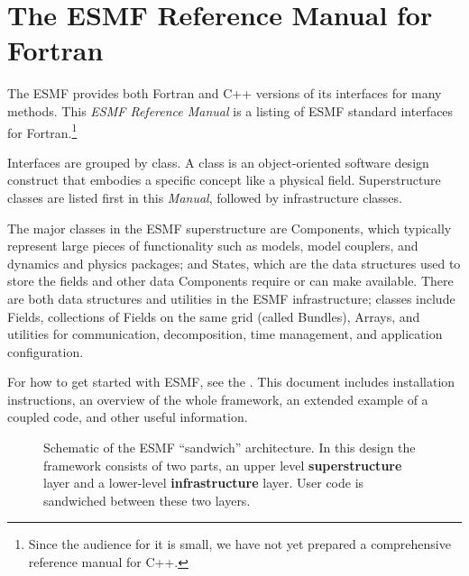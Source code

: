 \section{The ESMF Reference Manual for Fortran}

The ESMF provides both Fortran and C++ versions of its interfaces
for many methods.  This {\it ESMF Reference Manual} is a listing of 
ESMF standard interfaces for Fortran.\footnote{Since the audience for it is 
small, we have not yet prepared a comprehensive reference manual for C++.}  

Interfaces are grouped by class.  A class is an object-oriented software 
design construct that embodies 
a specific concept like a physical field.  Superstructure classes 
are listed first in this {\it Manual}, followed by infrastructure 
classes.

The major classes in the ESMF superstructure are Components, which 
typically represent
large pieces of functionality such as models, model couplers, and 
dynamics and physics packages; and States, which are the data structures
used to store the fields and other data Components require or can 
make available.  There are both data structures and utilities in the ESMF 
infrastructure; classes include Fields, collections of Fields on the 
same grid (called Bundles), Arrays, and utilities for communication,
decomposition, time management, and application configuration.

For how to get started with ESMF, see the 
.  This document includes installation instructions, an
overview of the whole framework, an extended example of a coupled code, 
and other useful information. 

\begin{center}
\begin{figure}
\caption{Schematic of the ESMF ``sandwich'' architecture. In this design the framework consists of two parts, an upper level
{\bf superstructure} layer and a lower-level {\bf infrastructure} layer. User code is sandwiched between these two layers.}
\label{fig:TheESMFwich}
\end{figure}
\end{center}

